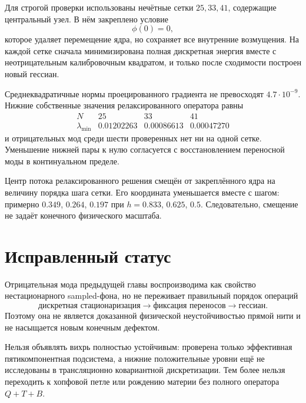 Для строгой проверки использованы нечётные сетки $25,33,41$, содержащие
центральный узел. В нём закреплено условие
\begin{equation}
 \phi(0)=0,
\end{equation}
которое удаляет перемещение ядра, но сохраняет все внутренние
возмущения. На каждой сетке сначала минимизирована полная дискретная
энергия вместе с неотрицательным калибровочным квадратом, и только после
сходимости построен новый гессиан.

Среднеквадратичные нормы проецированного градиента не превосходят
$4.7\cdot10^{-9}$. Нижние собственные значения релаксированного оператора
равны
\begin{equation}
\begin{array}{c|ccc}
 N & 25 & 33 & 41\\ \hline
 \lambda_{\min} &
 0.01202263 & 0.00086613 & 0.00047270
\end{array}
\end{equation}
и отрицательных мод среди шести проверенных нет ни на одной сетке.
Уменьшение нижней пары к нулю согласуется с восстановлением переносной
моды в континуальном пределе.

Центр потока релаксированного решения смещён от закреплённого ядра на
величину порядка шага сетки. Его координата уменьшается вместе с шагом:
примерно $0.349$, $0.264$, $0.197$ при $h=0.833$, $0.625$, $0.5$.
Следовательно, смещение не задаёт конечного физического масштаба.

\section{Исправленный статус}

Отрицательная мода предыдущей главы воспроизводима как свойство
нестационарного sampled-фона, но не переживает правильный порядок
операций
\begin{equation}
 \text{дискретная стационаризация}
 \longrightarrow
 \text{фиксация переносов}
 \longrightarrow
 \text{гессиан}.
\end{equation}
Поэтому она не является доказанной физической неустойчивостью прямой
нити и не насыщается новым конечным дефектом.

\begin{nogocriterion}
Нельзя объявлять вихрь полностью устойчивым: проверена только эффективная
пятикомпонентная подсистема, а нижние положительные уровни ещё не
исследованы в трансляционно ковариантной дискретизации. Тем более нельзя
переходить к хопфовой петле или рождению материи без полного оператора
$Q+T+B$.
\end{nogocriterion}

